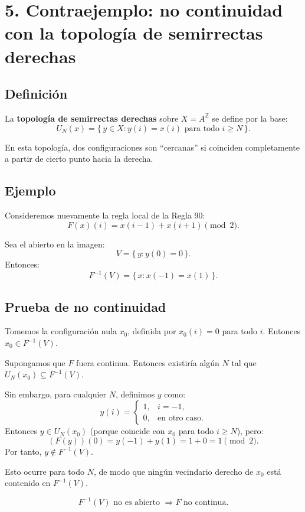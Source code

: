 \documentclass[12pt]{article}
\begin{document}
\section*{5. Contraejemplo: no continuidad con la topología de semirrectas derechas}

\subsection*{Definición}

La \textbf{topología de semirrectas derechas} sobre $X=A^{\mathbb{Z}}$ se define por la base:
\[
U_N(x) = \{\, y \in X : y(i)=x(i) \text{ para todo } i \ge N \,\}.
\]

En esta topología, dos configuraciones son ``cercanas'' si coinciden completamente a partir de cierto punto hacia la derecha.

\subsection*{Ejemplo}

Consideremos nuevamente la regla local de la Regla 90:
\[
F(x)(i) = x(i-1) + x(i+1) \pmod 2.
\]

Sea el abierto en la imagen:
\[
V = \{\, y : y(0)=0 \,\}.
\]
Entonces:
\[
F^{-1}(V) = \{\, x : x(-1)=x(1) \,\}.
\]

\subsection*{Prueba de no continuidad}

Tomemos la configuración nula $x_0$, definida por $x_0(i)=0$ para todo $i$.  
Entonces $x_0 \in F^{-1}(V)$.

Supongamos que $F$ fuera continua.  
Entonces existiría algún $N$ tal que $U_N(x_0) \subseteq F^{-1}(V)$.

Sin embargo, para cualquier $N$, definimos $y$ como:
\[
y(i) = 
\begin{cases}
1, & i=-1,\\
0, & \text{en otro caso.}
\end{cases}
\]
Entonces $y \in U_N(x_0)$ (porque coincide con $x_0$ para todo $i \ge N$),  
pero:
\[
(F(y))(0) = y(-1) + y(1) = 1 + 0 = 1 \pmod 2.
\]
Por tanto, $y \notin F^{-1}(V)$.

Esto ocurre para todo $N$, de modo que ningún vecindario derecho de $x_0$ está contenido en $F^{-1}(V)$.

\[
\boxed{F^{-1}(V) \text{ no es abierto } \Rightarrow F \text{ no continua.}}
\]
\end{document}

